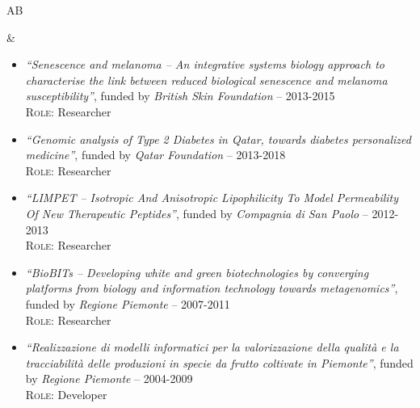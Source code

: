 \documentclass[a4paper,10pt]{article}
\newenvironment{doubletablelist}
{
	\vspace{-0.2cm}
	\begin{longtable}[!h]{AB}}{\end{longtable}
}
\newcommand{\dtlist}[2]{
\hspace{-3cm}
\noindent
	\begin{minipage}{0.24\textwidth}
	\begin{flushright}
	\textsc{#1}
	\end{flushright}
	\end{minipage}
	& #2\\[0.2cm]
}
\newcommand{\minusitem}{\item[-]}
\begin{document}
\begin{doubletablelist}
\dtlist{}{
	\vspace{-0.8cm}
	\begin{itemize} %
		\minusitem  \begin{minipage}{0.65\textwidth}
			\emph{``Senescence and melanoma -- An integrative systems biology approach to characterise the link between reduced biological senescence and melanoma susceptibility''}, funded by \emph{British Skin Foundation} -- 2013-2015\\
			\textsc{Role:} Researcher
		\end{minipage}
			
		\minusitem  \begin{minipage}{0.65\textwidth}
			\emph{``Genomic analysis of Type 2 Diabetes in Qatar, towards diabetes personalized medicine''}, funded by \emph{Qatar Foundation} -- 2013-2018\\
			\textsc{Role:} Researcher
		\end{minipage}
		\minusitem  \begin{minipage}{0.65\textwidth}
			\emph{``LIMPET -- Isotropic And Anisotropic Lipophilicity To Model Permeability Of New Therapeutic Peptides''}, funded by \emph{Compagnia di San Paolo} -- 2012-2013\\
			\textsc{Role:} Researcher
		\end{minipage}
		\minusitem   \begin{minipage}{0.65\textwidth}
			\emph{``BioBITs -- Developing white and green biotechnologies by converging platforms from biology and information technology towards metagenomics''}, funded by \emph{Regione Piemonte} -- 2007-2011\\
			\textsc{Role:} Researcher
		\end{minipage}	
		\minusitem  \begin{minipage}{0.65\textwidth}
			\emph{``Realizzazione di modelli informatici per la valorizzazione della qualit\`a e la tracciabilit\`a delle produzioni in specie da frutto coltivate in Piemonte''}, funded by \emph{Regione Piemonte} -- 2004-2009\\
			\textsc{Role:} Developer
		\end{minipage}		
	\end{itemize}
}



\end{doubletablelist}
\end{document}
